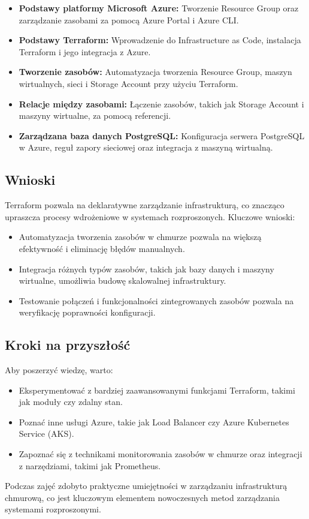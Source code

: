 \documentclass{article}
\begin{document}
\begin{itemize}
    \item \textbf{Podstawy platformy Microsoft Azure:} Tworzenie Resource Group oraz zarządzanie zasobami za pomocą Azure Portal i Azure CLI.
    \item \textbf{Podstawy Terraform:} Wprowadzenie do Infrastructure as Code, instalacja Terraform i jego integracja z Azure.
    \item \textbf{Tworzenie zasobów:} Automatyzacja tworzenia Resource Group, maszyn wirtualnych, sieci i Storage Account przy użyciu Terraform.
    \item \textbf{Relacje między zasobami:} Łączenie zasobów, takich jak Storage Account i maszyny wirtualne, za pomocą referencji.
    \item \textbf{Zarządzana baza danych PostgreSQL:} Konfiguracja serwera PostgreSQL w Azure, reguł zapory sieciowej oraz integracja z maszyną wirtualną.
\end{itemize}

\subsection{Wnioski}
Terraform pozwala na deklaratywne zarządzanie infrastrukturą, co znacząco upraszcza procesy wdrożeniowe w systemach rozproszonych. Kluczowe wnioski:
\begin{itemize}
    \item Automatyzacja tworzenia zasobów w chmurze pozwala na większą efektywność i eliminację błędów manualnych.
    \item Integracja różnych typów zasobów, takich jak bazy danych i maszyny wirtualne, umożliwia budowę skalowalnej infrastruktury.
    \item Testowanie połączeń i funkcjonalności zintegrowanych zasobów pozwala na weryfikację poprawności konfiguracji.
\end{itemize}

\subsection{Kroki na przyszłość}
Aby poszerzyć wiedzę, warto:
\begin{itemize}
    \item Eksperymentować z bardziej zaawansowanymi funkcjami Terraform, takimi jak moduły czy zdalny stan.
    \item Poznać inne usługi Azure, takie jak Load Balancer czy Azure Kubernetes Service (AKS).
    \item Zapoznać się z technikami monitorowania zasobów w chmurze oraz integracji z narzędziami, takimi jak Prometheus.
\end{itemize}

Podczas zajęć zdobyto praktyczne umiejętności w zarządzaniu infrastrukturą chmurową, co jest kluczowym elementem nowoczesnych metod zarządzania systemami rozproszonymi.
\end{document}
